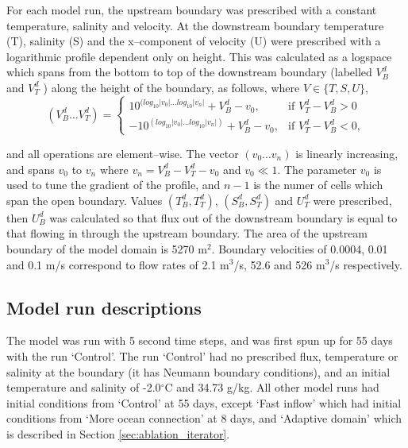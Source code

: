 For each model run, the upstream boundary was prescribed with a constant temperature, salinity and velocity. At the downstream boundary temperature (T), salinity (S) and the x--component of velocity (U) were prescribed with a logarithmic profile dependent only on height. This was calculated as a logspace which spans from the bottom to top of the downstream boundary (labelled $V^d_B$ and $V^d_T $ ) along the height of the boundary, as follows, where $V \in \{T,S,U\}$,
\[
    \left(V^d_B \dots V^d_T \right)= 
\begin{cases}
    10^{(log_{10}|v_0|...log_{10}|v_n|} + V^d_B - v_0, & \text{if } V^d_T - V^d_B>0\\
    -10^{(log_{10}|v_0|...log_{10}|v_n|)} + V^d_B - v_0,              & \text{if }   V^d_T - V^d_B<0,
\end{cases}
\]

and all operations are element--wise. The vector $(v_0...v_n)$ is linearly increasing, and spans $v_0$ to $v_n$ where $ v_n = V^d_B - V^d_T-v_0$ and $v_0 \ll 1$. The parameter $v_0$ is used to tune the gradient of the profile, and $n-1$ is the numer of cells which span the open boundary.
Values $\left(T^d_B, T^d_T\right)$, $\left(S^d_B, S^d_T\right)$ and $U^d_T$  were prescribed, then  $U^d_B$ was calculated so that flux out of the downstream boundary is equal to that flowing in through the upstream boundary.
The area of the upstream boundary of the model domain is 5270 $\mathrm{m}^2$. Boundary velocities of 0.0004, 0.01 and 0.1 $\mathrm{m}$/s correspond to flow rates of 2.1 $\mathrm{m}^3$/s, 52.6 and 526 $\mathrm{m}^3$/s respectively. 

\subsection{Model run descriptions} \label{sec:model_runs}

The model was run with 5 second time steps, and was first spun up for 55 days with the run `Control'. The run `Control' had no prescribed flux, temperature or salinity at the boundary (it has Neumann boundary conditions), and an initial temperature and salinity of  -2.0$^{\circ}$C  and 34.73 g/kg. All other model runs had initial conditions from `Control' at 55 days, except `Fast inflow' which had initial conditions from `More ocean connection' at 8 days, and `Adaptive domain' which is described in Section \ref{sec:ablation_iterator}.

